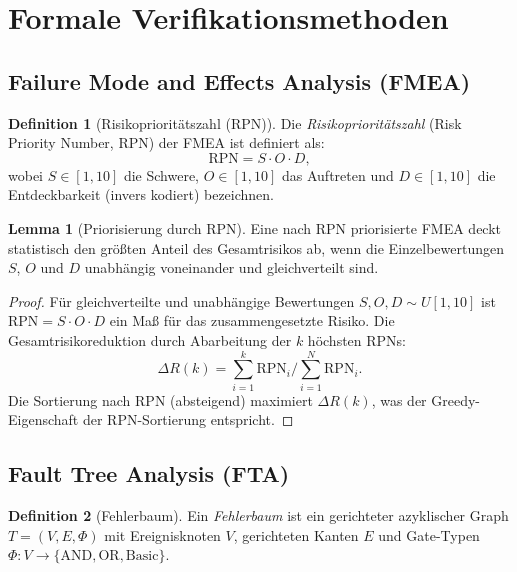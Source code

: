 ﻿\documentclass[a4paper,12pt]{article}
\theoremstyle{definition}
\newtheorem{definition}{Definition}
\newtheorem{lemma}{Lemma}
\begin{document}
\section{Formale Verifikationsmethoden}

\subsection{Failure Mode and Effects Analysis (FMEA)}

\begin{definition}[Risikoprioritätszahl (RPN)]
  Die \emph{Risikoprioritätszahl} (Risk Priority Number, RPN)
  der FMEA ist definiert als:
  \[
    \mathrm{RPN} = S \cdot O \cdot D,
  \]
  wobei $S \in [1, 10]$ die Schwere, $O \in [1, 10]$ das Auftreten
  und $D \in [1, 10]$ die Entdeckbarkeit (invers kodiert) bezeichnen.
\end{definition}

\begin{lemma}[Priorisierung durch RPN]
\label{lem:rpn}
  Eine nach RPN priorisierte FMEA deckt statistisch den größten
  Anteil des Gesamtrisikos ab, wenn die Einzelbewertungen $S$, $O$
  und $D$ unabhängig voneinander und gleichverteilt sind.
\end{lemma}

\begin{proof}
  Für gleichverteilte und unabhängige Bewertungen
  $S, O, D \sim U[1, 10]$ ist $\mathrm{RPN} = S \cdot O \cdot D$
  ein Maß für das zusammengesetzte Risiko.
  Die Gesamtrisikoreduktion durch Abarbeitung der $k$ höchsten RPNs:
  \[
    \Delta R(k)
    = \sum_{i=1}^{k} \mathrm{RPN}_i
      \Bigg/ \sum_{i=1}^{N} \mathrm{RPN}_i.
  \]
  Die Sortierung nach RPN (absteigend) maximiert $\Delta R(k)$,
  was der Greedy-Eigenschaft der RPN-Sortierung entspricht.
\end{proof}

\subsection{Fault Tree Analysis (FTA)}

\begin{definition}[Fehlerbaum]
  Ein \emph{Fehlerbaum} ist ein gerichteter azyklischer Graph
  $T = (V, E, \Phi)$ mit Ereignisknoten $V$, gerichteten Kanten $E$
  und Gate-Typen $\Phi: V \to \{\text{AND}, \text{OR}, \text{Basic}\}$.
\end{definition}
\end{document}
